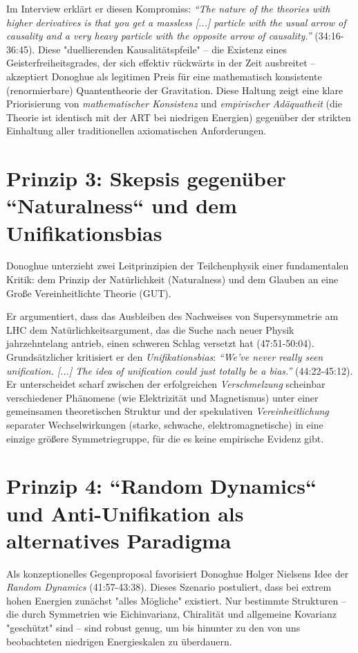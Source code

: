 	Im Interview erklärt er diesen Kompromiss: \emph{``The nature of the theories with higher derivatives is that you get a massless [...] particle with the usual arrow of causality and a very heavy particle with the opposite arrow of causality.''} \cite{DonoghueInterview2025} (34:16-36:45). Diese "duellierenden Kausalitätspfeile" – die Existenz eines Geisterfreiheitsgrades, der sich effektiv rückwärts in der Zeit ausbreitet – akzeptiert Donoghue als legitimen Preis für eine mathematisch konsistente (renormierbare) Quantentheorie der Gravitation. Diese Haltung zeigt eine klare Priorisierung von \emph{mathematischer Konsistenz} und \emph{empirischer Adäquatheit} (die Theorie ist identisch mit der ART bei niedrigen Energien) gegenüber der strikten Einhaltung aller traditionellen axiomatischen Anforderungen.
	
	\section{Prinzip 3: Skepsis gegenüber ``Naturalness`` und dem Unifikationsbias}
	
	Donoghue unterzieht zwei Leitprinzipien der Teilchenphysik einer fundamentalen Kritik: dem Prinzip der Natürlichkeit (Naturalness) und dem Glauben an eine Große Vereinheitlichte Theorie (GUT).
	
	Er argumentiert, dass das Ausbleiben des Nachweises von Supersymmetrie am LHC dem Natürlichkeitsargument, das die Suche nach neuer Physik jahrzehntelang antrieb, einen schweren Schlag versetzt hat \cite{DonoghueInterview2025} (47:51-50:04). Grundsätzlicher kritisiert er den \emph{Unifikationsbias}: \emph{``We've never really seen unification. [...] The idea of unification could just totally be a bias.''} \cite{DonoghueInterview2025} (44:22-45:12). Er unterscheidet scharf zwischen der erfolgreichen \emph{Verschmelzung} scheinbar verschiedener Phänomene (wie Elektrizität und Magnetismus) unter einer gemeinsamen theoretischen Struktur und der spekulativen \emph{Vereinheitlichung} separater Wechselwirkungen (starke, schwache, elektromagnetische) in eine einzige größere Symmetriegruppe, für die es keine empirische Evidenz gibt.
	
	\section{Prinzip 4: ``Random Dynamics`` und Anti-Unifikation als alternatives Paradigma}
	
	Als konzeptionelles Gegenproposal favorisiert Donoghue Holger Nielsens Idee der \emph{Random Dynamics} \cite{DonoghueInterview2025} (41:57-43:38). Dieses Szenario postuliert, dass bei extrem hohen Energien zunächst "alles Mögliche" existiert. Nur bestimmte Strukturen – die durch Symmetrien wie Eichinvarianz, Chiralität und allgemeine Kovarianz "geschützt" sind – sind robust genug, um bis hinunter zu den von uns beobachteten niedrigen Energieskalen zu überdauern.
	
